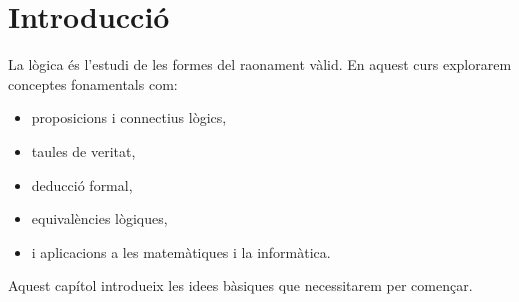 \section{Introducció}

La lògica és l'estudi de les formes del raonament vàlid. 
En aquest curs explorarem conceptes fonamentals com:

\begin{itemize}
    \item proposicions i connectius lògics,
    \item taules de veritat,
    \item deducció formal,
    \item equivalències lògiques,
    \item i aplicacions a les matemàtiques i la informàtica.
\end{itemize}

Aquest capítol introdueix les idees bàsiques que necessitarem per començar.
